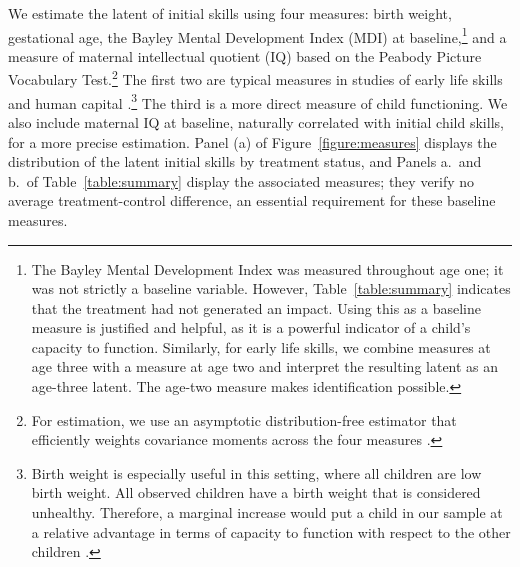 We estimate the latent of initial skills using four measures: birth weight, gestational age, the Bayley Mental Development Index (MDI) at baseline,\footnote{The Bayley Mental Development Index was measured throughout age one; it was not strictly a baseline variable. However, Table~\ref{table:summary} indicates that the treatment had not generated an impact. Using this as a baseline measure is justified and helpful, as it is a powerful indicator of a child's capacity to function. Similarly, for early life skills, we combine measures at age three with a measure at age two and interpret the resulting latent as an age-three latent. The age-two measure makes identification possible.} and a measure of maternal intellectual quotient (IQ) based on the Peabody Picture Vocabulary Test.\footnote{For estimation, we use an asymptotic distribution-free estimator that efficiently weights covariance moments across the four measures \citep{browne1984asymptotically}.} The first two are typical measures in studies of early life skills and human capital \citep[e.g.,][]{aizerProductionHumanCapital2012,rosenzweigHeterogeneityIntrafamilyDistribution1988}.\footnote{\label{footnote:birthweight}Birth weight is especially useful in this setting, where all children are low birth weight. All observed children have a birth weight that is considered unhealthy. Therefore, a marginal increase would put a child in our sample at a relative advantage in terms of capacity to function with respect to the other children \citep{boulet2011birth,boardman2002low}.} The third is a more direct measure of child functioning. We also include maternal IQ at baseline, naturally correlated with initial child skills, for a more precise estimation. Panel (a) of Figure~\ref{figure:measures} displays the distribution of the latent initial skills by treatment status, and Panels a.\ and b.\ of Table~\ref{table:summary} display the associated measures; they verify no average treatment-control difference, an essential requirement for these baseline measures. 

